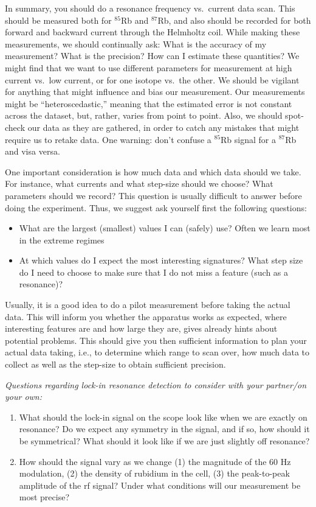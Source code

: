 \documentclass{../lab}
\begin{document}
In summary, you should do a resonance frequency vs.\ current data scan.  This should be measured both for $^{85}$Rb and $^{87}$Rb, and also should be recorded for both forward and backward current through the Helmholtz coil.  While making these measurements, we should continually ask:  What is the accuracy of my measurement?  What is the precision?  How can I estimate these quantities?  We might find that we want to use different parameters for measurement at high current vs.\ low current, or for one isotope vs.\ the other.  We should be vigilant for anything that might influence and bias our measurement.  Our measurements might be ``heteroscedastic,'' meaning that the estimated error is not constant across the dataset, but, rather, varies from point to point. Also, we should spot-check our data as they are gathered, in order to catch any mistakes that might require us to retake data.  One warning: don't confuse a $^{85}$Rb signal for a $^{87}$Rb and visa versa.

One important consideration is how much data and which data should we take. For instance, what currents and what step-size should we choose? What parameters should we record? This question is usually difficult to answer before doing the experiment. Thus, we suggest ask yourself first the following questions: 
\begin{itemize}

\item What are the largest (smallest) values I can (safely) use? Often we learn most in the extreme regimes
\item At which values do I expect the most interesting signatures? What step size do I need to choose to make sure that I do not miss a feature (such as a resonance)?
\end{itemize}
Usually, it is a good idea to do a pilot measurement before taking the actual data. This will inform you whether the apparatus works as expected, where interesting features are and how large they are, gives already hints about potential problems. This should give you then sufficient information to plan your actual data taking, i.e., to determine which range to scan over, how much data to collect as well as the step-size  to obtain sufficient precision. 

\emph{Questions regarding lock-in resonance detection to consider with your partner/on your own:}
\begin{enumerate}[resume=forstudents,label=Q\arabic*.]%
\item What should the lock-in signal on the scope look like when we are exactly on resonance?  Do we expect any symmetry in the signal, and if so, how should it be symmetrical?  What should it look like if we are just slightly off resonance?
\item How should the signal vary as we change (1) the magnitude of the 60 Hz modulation, (2) the density of rubidium in the cell, (3) the peak-to-peak amplitude of the rf signal?  Under what conditions will our measurement be most precise?
\end{enumerate}
\end{document}
